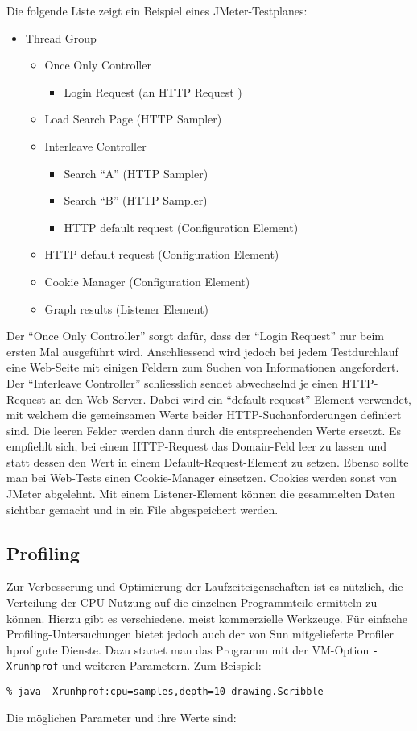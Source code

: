 \newslide
Die folgende Liste zeigt ein Beispiel eines JMeter-Testplanes:
\begin{itemize}
\item Thread Group
  \begin{itemize}
    \item Once Only Controller
      \begin{itemize}
        \item Login Request (an HTTP Request )
      \end{itemize}
      \item Load Search Page (HTTP Sampler)
      \item Interleave Controller
      \begin{itemize}
        \item Search ``A'' (HTTP Sampler)
        \item Search ``B'' (HTTP Sampler)
        \item HTTP default request (Configuration Element)
      \end{itemize}
      \item HTTP default request (Configuration Element)
      \item Cookie Manager (Configuration Element)
      \item Graph results (Listener Element)
  \end{itemize}
\end{itemize}
Der ``Once Only Controller'' sorgt dafür, dass der
``Login Request'' nur beim  ersten Mal ausgeführt wird. Anschliessend wird
jedoch bei jedem Testdurchlauf eine Web-Seite mit einigen Feldern zum Suchen
von Informationen angefordert. Der ``Interleave Controller'' schliesslich
sendet abwechselnd je einen HTTP-Request an den Web-Server. Dabei wird ein
``default request''-Element verwendet, mit welchem die gemeinsamen Werte beider
HTTP-Such\-an\-for\-der\-ungen definiert sind. Die leeren Felder werden dann durch die
entsprechenden Werte ersetzt. Es empfiehlt sich, bei einem HTTP-Request das
Domain-Feld leer zu lassen und statt dessen den Wert in einem
Default-Request-Element zu setzen. Ebenso sollte man bei Web-Tests einen
Cookie-Manager einsetzen. Cookies werden sonst von JMeter abgelehnt.
Mit einem Listener-Element können die gesammelten Daten sichtbar gemacht und
in ein File abgespeichert werden.
%
\newpage
\subsection{Profiling}
Zur Verbesserung und Optimierung der Laufzeiteigenschaften ist es nützlich, die
Verteilung der CPU-Nutzung auf die einzelnen Programmteile ermitteln zu
können. Hierzu gibt es verschiedene, meist kommerzielle Werkzeuge. Für einfache
Profiling-Untersuchungen bietet jedoch auch der von Sun mitgelieferte
Profiler hprof gute Dienste. Dazu startet man das Programm mit der
VM-Option \verb+-Xrunhprof+ und weiteren Parametern. Zum Beispiel:
\begin{lstlisting}
% java -Xrunhprof:cpu=samples,depth=10 drawing.Scribble
\end{lstlisting}
\newslide
Die möglichen Parameter und ihre Werte sind:

